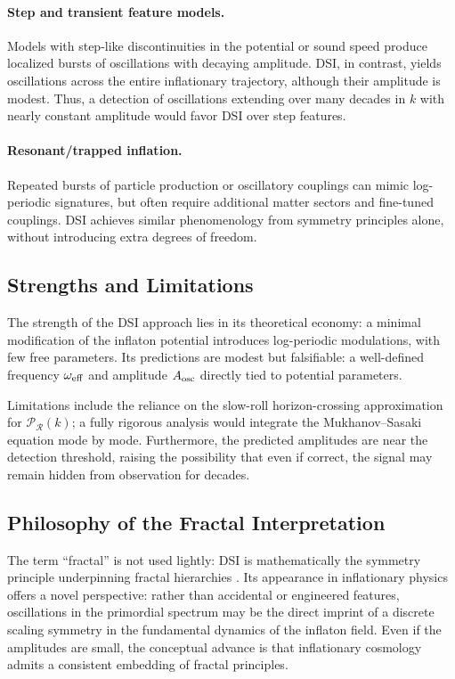 \documentclass[reprint, amsmath, amssymb, aps, prd, nofootinbib]{revtex4-2}
\begin{document}
\paragraph{Step and transient feature models.}
Models with step-like discontinuities in the potential or sound speed
\cite{Adshead2012,Chen2010} produce localized bursts of oscillations
with decaying amplitude. DSI, in contrast, yields oscillations across the
entire inflationary trajectory, although their amplitude is modest.
Thus, a detection of oscillations extending over many decades in $k$ with
nearly constant amplitude would favor DSI over step features.

\paragraph{Resonant/trapped inflation.}
Repeated bursts of particle production or oscillatory couplings can mimic
log-periodic signatures, but often require additional matter sectors
and fine-tuned couplings. DSI achieves similar phenomenology from symmetry
principles alone, without introducing extra degrees of freedom.

\subsection{Strengths and Limitations}

The strength of the DSI approach lies in its theoretical economy:
a minimal modification of the inflaton potential introduces
log-periodic modulations, with few free parameters.
Its predictions are modest but falsifiable: a well-defined frequency
$\omega_{\rm eff}$ and amplitude $A_{\rm osc}$ directly tied to
potential parameters.

Limitations include the reliance on the slow-roll horizon-crossing
approximation for $\mathcal{P}_\mathcal{R}(k)$; a fully rigorous analysis
would integrate the Mukhanov--Sasaki equation mode by mode.
Furthermore, the predicted amplitudes are near the detection threshold,
raising the possibility that even if correct, the signal may remain
hidden from observation for decades.

\subsection{Philosophy of the Fractal Interpretation}

The term ``fractal'' is not used lightly: DSI is mathematically the
symmetry principle underpinning fractal hierarchies \cite{Sornette1998}.
Its appearance in inflationary physics offers a novel perspective:
rather than accidental or engineered features, oscillations in the
primordial spectrum may be the direct imprint of a discrete scaling
symmetry in the fundamental dynamics of the inflaton field.
Even if the amplitudes are small, the conceptual advance is that
inflationary cosmology admits a consistent embedding of fractal
principles.
\end{document}
